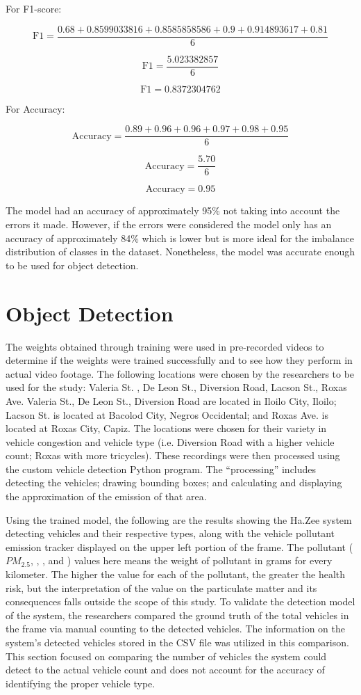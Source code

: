 For F1-score:

\[{\text{F1}}= \frac{0.68 + 0.8599033816 + 0.8585858586 + 0.9 + 0.914893617 + 0.81}{6} \]

\[{\text{F1}}=  \frac{5.023382857}{6} \]


\[{\text{F1}}= 0.8372304762 \]

For Accuracy:


\[{\text{Accuracy}}= \frac{0.89 + 0.96 + 0.96 + 0.97 + 0.98 + 0.95}{6} \]

\[{\text{Accuracy}}=  \frac{5.70}{6} \]


\[{\text{Accuracy}}= 0.95 \]

The model had an accuracy of approximately 95\% not taking into account the errors it made. However, if the errors were considered the model only has an accuracy of approximately 84\% which is lower but is more ideal for the imbalance distribution of classes in the dataset. Nonetheless, the model was accurate enough to be used for object detection.




\section{Object Detection}

The weights obtained through training were used in pre-recorded videos to determine if the weights were trained successfully and to see how they perform in actual video footage. The following locations were chosen by the researchers to be used for the study: Valeria St. , De Leon St., Diversion Road, Lacson St., Roxas Ave. Valeria St., De Leon St., Diversion Road are located in Iloilo City, Iloilo; Lacson St. is located at Bacolod City, Negros Occidental; and Roxas Ave. is located at Roxas City, Capiz.  The locations were chosen for their variety in vehicle congestion and vehicle type (i.e. Diversion Road with a higher vehicle count; Roxas with more tricycles).  These recordings were then processed using the custom vehicle detection Python program. The “processing” includes detecting the vehicles; drawing bounding boxes; and calculating and displaying the approximation of the emission of that area. 

Using the trained model,  the following are the results showing the Ha.Zee system detecting vehicles and their respective types, along with the vehicle pollutant emission tracker displayed on the upper left portion of the frame. The pollutant ($PM_{2.5}$, , , and ) values here means the weight of pollutant in grams for every kilometer. The higher the value for each of the pollutant, the greater the health risk, but the interpretation of the value on the particulate matter and its consequences falls outside the scope of this study.  To validate the detection model of the system, the researchers compared the ground truth of the total vehicles in the frame via manual counting to the detected vehicles. The information on the system’s detected vehicles stored in the CSV file was utilized in this comparison. This section focused on comparing the number of vehicles the system could detect to the actual vehicle count and does not account for the accuracy of identifying the proper vehicle type.


